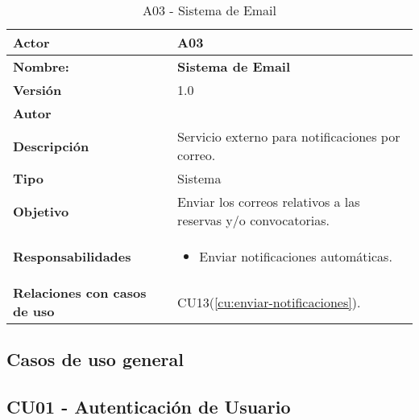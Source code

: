 \begin{table}[H]
	\centering
	\begin{tabularx}{\linewidth}{ p{} p{} }
		\toprule
		\textbf{Actor}    & A03 \\
		\toprule
		\textbf{Nombre:} 			  & \textbf{Sistema de Email} \\
		\textbf{Versión}              & 1.0    \\
		\textbf{Autor}                & \nombre \\
		\textbf{Descripción}          & Servicio externo para notificaciones por correo. \\
		\textbf{Tipo}                 & Sistema \\
		\textbf{Objetivo}             & Enviar los correos relativos a las reservas y/o convocatorias. \\
		\textbf{Responsabilidades}    & 
		\begin{itemize}
			\tightlist
			\item Enviar notificaciones automáticas.
		\end{itemize}\\
		\textbf{Relaciones con casos de uso} & CU13(\ref{cu:enviar-notificaciones}). \\
		\bottomrule
	\end{tabularx}
	\caption{A03 - Sistema de Email}
	\label{actor:sistema-email}
\end{table}

\subsection{Casos de uso general}



\subsection{CU01 - Autenticación de Usuario}

